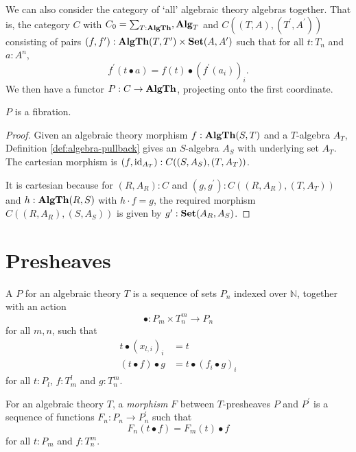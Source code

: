 We can also consider the category of `all' algebraic theory algebras together. That is, the category $ C $ with $ C_0 = \sum_{T : \mathbf{AlgTh}}, \mathbf{Alg}_{T} $ and $ C((T, A), (T^\prime, A^\prime)) $ consisting of pairs $ (f, f^\prime): \mathbf{AlgTh}(T, T^\prime) \times \mathbf{Set}(A, A^\prime) $ such that for all $ t: T_n $ and $ a: A^n $,
\[ f^\prime(t \bullet a) = f(t) \bullet (f^\prime(a_i))_i. \]
We then have a functor $ P: C \to \mathbf{AlgTh} $, projecting onto the first coordinate.

\begin{lemma}\label{lem:algebra-fibration}
  $ P $ is a fibration.
\end{lemma}
\begin{proof}
  Given an algebraic theory morphism $ f: \mathbf{AlgTh}(S, T) $ and a $ T $-algebra $ A_T $, Definition \ref{def:algebra-pullback} gives an $ S $-algebra $ A_S $ with underlying set $ A_T $. The cartesian morphism is $ (f, \text{id}_{A_T}): C((S, A_S), (T, A_T)) $.

  It is cartesian because for $ (R, A_R): C $ and $ (g, g^\prime): C((R, A_R), (T, A_T)) $ and $ h: \mathbf{AlgTh}(R, S) $ with $ h \cdot f = g $, the required morphism $ C((R, A_R), (S, A_S)) $ is given by $ g^\prime: \mathbf{Set}(A_R, A_S) $.
\end{proof}

\section{Presheaves}

\begin{definition}
  A  $ P $ for an algebraic theory $ T $ is a sequence of sets $ P_n $ indexed over $ \mathbb N $, together with an action
  \[ \bullet: P_m \times T_n^m \to P_n \]
  for all $ m, n $, such that
  \begin{align*}
    t \bullet (x_{l, i})_i &= t\\
    (t \bullet f) \bullet g &= t \bullet (f_i \bullet g)_i
  \end{align*}
  for all $ t: P_l $, $ f: T_m^l $ and $ g: T_n^m $.
\end{definition}

\begin{definition}
  For an algebraic theory $ T $, a \textit{morphism} $ F $ between $ T $-presheaves $ P $ and $ P^\prime $ is a sequence of functions $ F_n: P_n \to P^\prime_n $ such that
  \[ F_n(t \bullet f) = F_m(t) \bullet f \]
  for all $ t: P_m $ and $ f: T_n^m $.
\end{definition}

